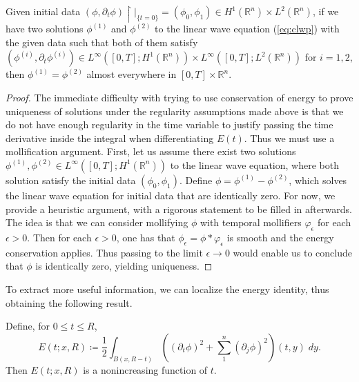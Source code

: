 \documentclass{article}
\begin{document}
\begin{corollary}[Uniqueness I]
	Given initial data $(\phi, \partial_{t}\phi)\upharpoonright|_{\{t = 0\}}= (\phi_{0}, \phi_{1}) \in H^{1}(\mathbb{R}^{n}) \times L^{2}(\mathbb{R}^{n})$, if we have two solutions $\phi^{(1)}$ and $\phi^{(2)}$ to the linear wave equation (\ref{eq:clwp}) with the given data such that both of them satisfy $(\phi^{(i)}, \partial_{t}\phi^{(i)}) \in L^{\infty}([0,T]; H^{1}(\mathbb{R}^{n})) \times L^{\infty}([0,T]; L^{2}(\mathbb{R}^{n}))$ for $i = 1, 2$, then $\phi^{(1)} = \phi^{(2)}$ almost everywhere in $[0,T] \times \mathbb{R}^{n}$. 
\end{corollary}
\begin{proof}
The immediate difficulty with trying to use conservation of energy to prove uniqueness of solutions under the regularity assumptions made above is that we do not have enough regularity in the time variable to justify passing the time derivative inside the integral when differentiating $E(t)$. Thus we must use a mollification argument. First, let us assume there exist two solutions $\phi^{(1)}, \phi^{(2)} \in L^{\infty}([0,T]; H^{1}(\mathbb{R}^{n}))$ to the linear wave equation, where both solution satisfy the initial data $(\phi_{0}, \phi_{1})$. Define $\phi = \phi^{(1)} - \phi^{(2)}$, which solves the linear wave equation for initial data that are identically zero. For now, we provide a heuristic argument, with a rigorous statement to be filled in afterwards. The idea is that we can consider mollifying $\phi$ with temporal mollifiers $\varphi_{\epsilon}$ for each $\epsilon > 0$. Then for each $\epsilon > 0$, one has that $\phi_{\epsilon} = \phi \ast \varphi_{\epsilon}$ is smooth and the energy conservation applies. Thus passing to the limit $\epsilon \to 0$ would enable us to conclude that $\phi$ is identically zero, yielding uniqueness. 
\end{proof} 

To extract more useful information, we can localize the energy identity, thus obtaining the following result. 

\begin{prop}
	Define, for $0 \leq t \leq R$, 
	\begin{equation}
		E(t;x, R) \coloneqq \frac{1}{2}\int_{B(x, R - t)}\left((\partial_{t}\phi)^{2} + \sum_{1}^{n}(\partial_{j}\phi)^{2}\right)(t, y)\;dy. 
		\label{eq:local_e_id}
	\end{equation}
	Then $E(t;x, R)$ is a nonincreasing function of $t$. 
\end{prop} 
\end{document}

